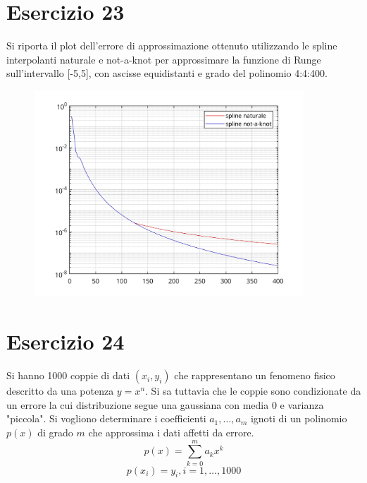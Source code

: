 \documentclass[10pt,a4paper]{article}
\begin{document}
\section*{Esercizio 23}
Si riporta il plot dell’errore di approssimazione ottenuto utilizzando le spline interpolanti naturale e not-a-knot per approssimare la funzione di Runge sull’intervallo [-5,5], con ascisse equidistanti e grado del polinomio 4:4:400.
\begin{figure}[h!]
  \centering
  \includegraphics[width=0.9\textwidth]{../figure/esercizio_23}  
\end{figure}
\section*{Esercizio 24}
Si hanno 1000 coppie di dati $(x_i,y_i)$ che rappresentano un fenomeno fisico descritto da una potenza $y=x^n$. Si sa tuttavia che le coppie sono condizionate da un errore la cui distribuzione segue una gaussiana con media 0 e varianza "piccola". Si vogliono determinare i coefficienti $a_1,\dots,a_m$ ignoti di un polinomio $p(x)$ di grado $m$ che approssima i dati affetti da errore.
$$p(x)=\sum_{k=0}^ma_kx^k$$$$p(x_i)=y_i, i = 1,\dots,1000$$
\end{document}
